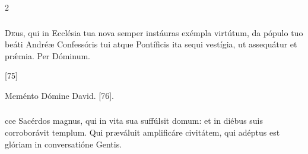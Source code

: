 \documentclass[9pt,twoside]{extarticle}
\begin{document}
\begin{multicols}{2}
\subsubsection*{\center {}}
\lettrine{D}eus, qui in Ecclésia tua nova semper instáuras exémpla virtútum, da pópulo tuo beáti Andréæ Confessóris tui atque Pontíficis ita sequi vestígia, ut assequátur et prǽmia. Per Dóminum.

\begin{tightlist}{}
\item {} [75]
\item {} Meménto Dómine David. [76].
\end{tightlist}

\subsubsection*{}
cce Sacérdos magnus, qui in vita sua suffúlsit domum: et in diébus suis corroborávit templum. Qui præváluit amplificáre civitátem, qui adéptus est glóriam in conversatióne Gentis.


\end{multicols}
\end{document}
